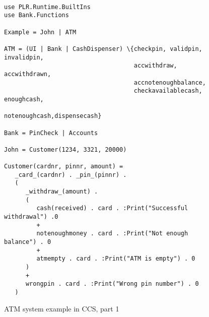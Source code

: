   
\begin{figure}[b!]
\label{fig:atm_system1}
\caption{ATM system example in CCS, part 1}
\lstset{showtabs=false,showspaces=false,showstringspaces=false}
\begin{lstlisting}[frame=trbl,basicstyle=\footnotesize\ttfamily,showtabs=false,showspaces=false]

use PLR.Runtime.BuiltIns
use Bank.Functions

Example = John | ATM 

ATM = (UI | Bank | CashDispenser) \{checkpin, validpin, invalidpin,
                                    accwithdraw, accwithdrawn,
                                    accnotenoughbalance, 
                                    checkavailablecash, enoughcash, 
                                    notenoughcash,dispensecash} 

Bank = PinCheck | Accounts 

John = Customer(1234, 3321, 20000)

Customer(cardnr, pinnr, amount) = 
   _card_(cardnr) . _pin_(pinnr) .
   (
      _withdraw_(amount) . 
      (
         cash(received) . card . :Print("Successful withdrawal") .0 
         +   
         notenoughmoney . card . :Print("Not enough balance") . 0
         +
         atmempty . card . :Print("ATM is empty") . 0
      )
      +
      wrongpin . card . :Print("Wrong pin number") . 0
   )

\end{lstlisting}
\end{figure}	

